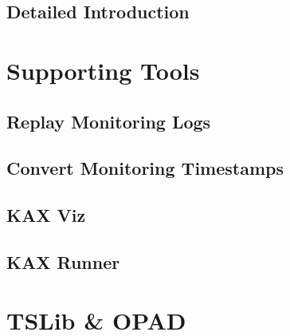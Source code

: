 		\subsection{Detailed Introduction}		
			
	\section{Supporting Tools}
		\subsection{Replay Monitoring Logs}
		\subsection{Convert Monitoring Timestamps}
		\subsection{KAX Viz}
		\subsection{KAX Runner}
		
	\section{TSLib \& OPAD}
	